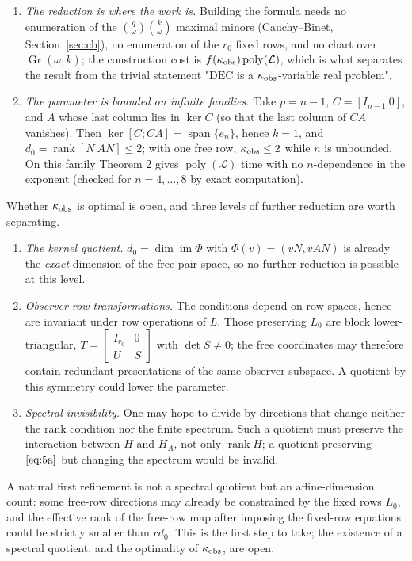 \documentclass[journal]{IEEEtran}
\theoremstyle{plainn}
\theoremstyle{remark}
\begin{document}
\begin{enumerate}
\item \emph{The reduction is where the work is.} Building the formula needs no enumeration of the $\binom q\omega\binom k\omega$ maximal minors (Cauchy--Binet, Section~\ref{sec:cb}), no enumeration of the $r_0$ fixed rows, and no chart over $\operatorname{Gr}(\omega,k)$; the construction cost is $f(\kappa_{\rm obs})\operatorname{poly}(\mathcal L)$, which is what separates the result from the trivial statement "$\mathrm{DEC}$ is a $\kappa_{\rm obs}$-variable real problem".
\item \emph{The parameter is bounded on infinite families.} Take $p=n-1$, $C=[I_{n-1}\ 0]$, and $A$ whose last column lies in $\ker C$ (so that the last column of $CA$ vanishes). Then $\ker[C;CA]=\operatorname{span}\{e_n\}$, hence $k=1$, and $d_0=\operatorname{rank}[N\ AN]\le2$; with one free row, $\kappa_{\rm obs}\le2$ while $n$ is unbounded. On this family Theorem 2 gives $\operatorname{poly}(\mathcal L)$ time with no $n$-dependence in the exponent (checked for $n=4,\dots,8$ by exact computation).
\end{enumerate}
Whether $\kappa_{\rm obs}$ is optimal is open, and three levels of further reduction are worth separating.

\begin{enumerate}
\item \emph{The kernel quotient.} $d_0=\dim\operatorname{im}\Phi$ with $\Phi(v)=(vN,vAN)$ is already the \emph{exact} dimension of the free-pair space, so no further reduction is possible at this level.
\item \emph{Observer-row transformations.} The conditions depend on row spaces, hence are invariant under row operations of $L$. Those preserving $L_0$ are block lower-triangular, $T=\begin{bmatrix}I_{r_0}&0\\ U&S\end{bmatrix}$ with $\det S\ne0$; the free coordinates may therefore contain redundant presentations of the same observer subspace. A quotient by this symmetry could lower the parameter.
\item \emph{Spectral invisibility.} One may hope to divide by directions that change neither the rank condition nor the finite spectrum. Such a quotient must preserve the interaction between $H$ and $H_A$, not only $\operatorname{rank}H$; a quotient preserving $\eqref{eq:5a}$ but changing the spectrum would be invalid.
\end{enumerate}
A natural first refinement is not a spectral quotient but an affine-dimension count: some free-row directions may already be constrained by the fixed rows $L_0$, and the effective rank of the free-row map after imposing the fixed-row equations could be strictly smaller than $rd_0$. This is the first step to take; the existence of a spectral quotient, and the optimality of $\kappa_{\rm obs}$, are open.
\end{document}
